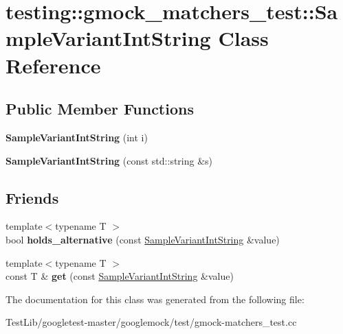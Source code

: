 \hypertarget{classtesting_1_1gmock__matchers__test_1_1SampleVariantIntString}{}\section{testing\+:\+:gmock\+\_\+matchers\+\_\+test\+:\+:Sample\+Variant\+Int\+String Class Reference}
\label{classtesting_1_1gmock__matchers__test_1_1SampleVariantIntString}
\subsection*{Public Member Functions}
\begin{DoxyCompactItemize}
\item 
\mbox{\label{classtesting_1_1gmock__matchers__test_1_1SampleVariantIntString_a362f135d65f8dd024202cc4908b510e2}} 
{\bfseries Sample\+Variant\+Int\+String} (int i)
\item 
\mbox{\label{classtesting_1_1gmock__matchers__test_1_1SampleVariantIntString_a2cca84a8b8af0726efab2b28df5e2880}} 
{\bfseries Sample\+Variant\+Int\+String} (const std\+::string \&s)
\end{DoxyCompactItemize}
\subsection*{Friends}
\begin{DoxyCompactItemize}
\item 
\mbox{\label{classtesting_1_1gmock__matchers__test_1_1SampleVariantIntString_a3139754402f0352ddea2ba7823ad16f1}} 
{\footnotesize template$<$typename T $>$ }\\bool {\bfseries holds\+\_\+alternative} (const \hyperlink{classtesting_1_1gmock__matchers__test_1_1SampleVariantIntString}{Sample\+Variant\+Int\+String} \&value)
\item 
\mbox{\label{classtesting_1_1gmock__matchers__test_1_1SampleVariantIntString_a492b2fd643a25c4345f56c68369ebd54}} 
{\footnotesize template$<$typename T $>$ }\\const T \& {\bfseries get} (const \hyperlink{classtesting_1_1gmock__matchers__test_1_1SampleVariantIntString}{Sample\+Variant\+Int\+String} \&value)
\end{DoxyCompactItemize}


The documentation for this class was generated from the following file\+:\begin{DoxyCompactItemize}
\item 
Test\+Lib/googletest-\/master/googlemock/test/gmock-\/matchers\+\_\+test.\+cc\end{DoxyCompactItemize}
